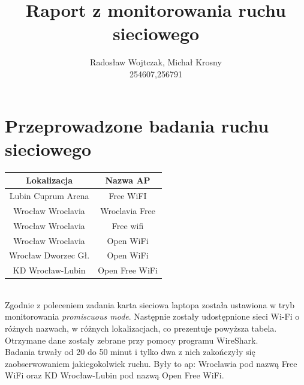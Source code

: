 \documentclass[12pt,a4paper]{article}
\title{Raport z monitorowania ruchu sieciowego}
\author{Radosław Wojtczak, Michał Krosny\\ 254607,256791}
\begin{document}
    \maketitle
    \newpage
    \section{Przeprowadzone badania ruchu sieciowego} 
        \begin{center}
            \begin{tabular}{|c|c|}
                \hline
                Lokalizacja & Nazwa AP\\
                \hline
                Lubin Cuprum Arena & Free WiFI\\
                Wrocław Wroclavia & Wroclavia Free\\
                Wrocław Wroclavia & Free wifi\\
                Wrocław Wroclavia & Open WiFi\\
                Wrocław Dworzec Gł. & Open WiFi\\
                KD Wrocław-Lubin & Open Free WiFi\\
                \hline
            \end{tabular}
        \end{center}~\\
        Zgodnie z poleceniem zadania karta sieciowa laptopa została ustawiona w tryb monitorowania \textit{promiscuous mode}. Następnie zostały udostępnione sieci Wi-Fi o różnych nazwach, w różnych lokalizacjach, co prezentuje powyższa tabela. Otrzymane dane zostały zebrane przy pomocy programu WireShark. \\
        Badania trwały od 20 do 50 minut i tylko dwa z nich zakończyły się zaobserwowaniem jakiegokolwiek ruchu.
        Były to ap: Wroclawia pod nazwą Free WiFi oraz KD Wrocław-Lubin pod nazwą Open Free WiFi.
    
    
\end{document}
